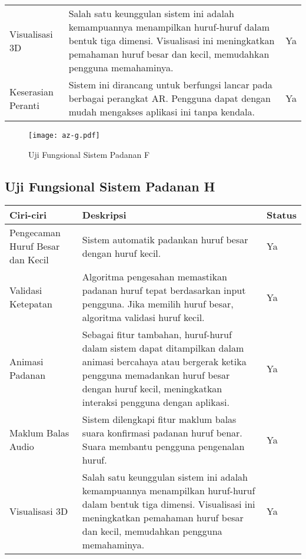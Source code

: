 \begin{itemize}
\begin{itemize}
\begin{itemize}
\begin{itemize}
\begin{itemize}
\begin{itemize}
\begin{itemize}
\begin{itemize}
\begin{flushleft}
\begin{tabular}{>{\raggedright}p{3cm}p{9cm}>{\centering\arraybackslash}p{2cm}}
Visualisasi 3D & Salah satu keunggulan sistem ini adalah kemampuannya menampilkan huruf-huruf dalam bentuk tiga dimensi. Visualisasi ini meningkatkan pemahaman huruf besar dan kecil, memudahkan pengguna memahaminya. & Ya \\

Keserasian Peranti & Sistem ini dirancang untuk berfungsi lancar pada berbagai perangkat AR. Pengguna dapat dengan mudah mengakses aplikasi ini tanpa kendala. & Ya \\
\bottomrule
\end{tabular}
\begin{figure}
    \centering
    \texttt{[image: az-g.pdf]}
    \caption{Uji Fungsional  Sistem Padanan F }
    \label{fig:az-f.pdf}
\end{figure}
\clearpage


\subsection{Uji Fungsional  Sistem Padanan H}

\begin{tabular}{>{\raggedright}p{3cm}p{9cm}>{\centering\arraybackslash}p{2cm}}
\toprule
\textbf{Ciri-ciri} & \textbf{Deskripsi} & \textbf{Status} \\
\midrule
Pengecaman Huruf Besar dan Kecil & Sistem automatik padankan huruf besar dengan huruf kecil. & Ya \\

Validasi Ketepatan & Algoritma pengesahan memastikan padanan huruf tepat berdasarkan input pengguna. Jika memilih huruf besar, algoritma validasi huruf kecil. & Ya \\

Animasi Padanan & Sebagai fitur tambahan, huruf-huruf dalam sistem dapat ditampilkan dalam animasi bercahaya atau bergerak ketika pengguna memadankan huruf besar dengan huruf kecil, meningkatkan interaksi pengguna dengan aplikasi. & Ya \\

Maklum Balas Audio & Sistem dilengkapi fitur maklum balas suara konfirmasi padanan huruf benar. Suara membantu pengguna pengenalan huruf. & Ya \\

Visualisasi 3D & Salah satu keunggulan sistem ini adalah kemampuannya menampilkan huruf-huruf dalam bentuk tiga dimensi. Visualisasi ini meningkatkan pemahaman huruf besar dan kecil, memudahkan pengguna memahaminya. & Ya \\


\end{tabular}
\end{flushleft}
\end{itemize}
\end{itemize}
\end{itemize}
\end{itemize}
\end{itemize}
\end{itemize}
\end{itemize}
\end{itemize}
